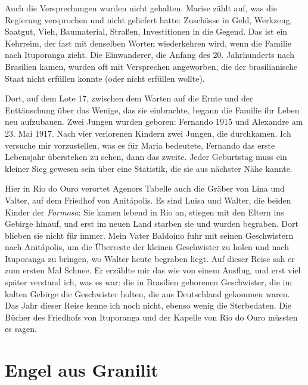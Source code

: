 \documentclass[
  ngerman,
  11pt,
  openany]{book}
\begin{document}
Auch die Versprechungen wurden nicht gehalten. Marise zählt auf, was die
Regierung versprochen und nicht geliefert hatte: Zuschüsse in Geld,
Werkzeug, Saatgut, Vieh, Baumaterial, Straßen, Investitionen in die
Gegend. Das ist ein Kehrreim, der fast mit denselben Worten wiederkehren
wird, wenn die Familie nach Ituporanga zieht. Die Einwanderer, die
Anfang des 20. Jahrhunderts nach Brasilien kamen, wurden oft mit
Versprechen angeworben, die der brasilianische Staat nicht erfüllen
konnte (oder nicht erfüllen wollte).

Dort, auf dem Lote 17, zwischen dem Warten auf die Ernte und der
Enttäuschung über das Wenige, das sie einbrachte, begann die Familie ihr
Leben neu aufzubauen. Zwei Jungen wurden geboren: Fernando 1915 und
Alexandre am 23. Mai 1917. Nach vier verlorenen Kindern zwei Jungen, die
durchkamen. Ich versuche mir vorzustellen, was es für Maria bedeutete,
Fernando das erste Lebensjahr überstehen zu sehen, dann das zweite.
Jeder Geburtstag muss ein kleiner Sieg gewesen sein über eine Statistik,
die sie aus nächster Nähe kannte.

Hier in Rio do Ouro verortet Agenors Tabelle auch die Gräber von Lina
und Valter, auf dem Friedhof von Anitápolis. Es sind Luisa und Walter,
die beiden Kinder der \emph{Formosa}: Sie kamen lebend in Rio an,
stiegen mit den Eltern ins Gebirge hinauf, und erst im neuen Land
starben sie und wurden begraben. Dort blieben sie nicht für immer. Mein
Vater Baldoíno fuhr mit seinen Geschwistern nach Anitápolis, um die
Überreste der kleinen Geschwister zu holen und nach Ituporanga zu
bringen, wo Walter heute begraben liegt. Auf dieser Reise sah er zum
ersten Mal Schnee. Er erzählte mir das wie von einem Ausflug, und erst
viel später verstand ich, was es war: die in Brasilien geborenen
Geschwister, die im kalten Gebirge die Geschwister holten, die aus
Deutschland gekommen waren. Das Jahr dieser Reise kenne ich noch nicht,
ebenso wenig die Sterbedaten. Die Bücher des Friedhofs von Ituporanga
und der Kapelle von Rio do Ouro müssten es sagen.

\section{Engel aus Granilit}\label{engel-aus-granilit}
\end{document}
